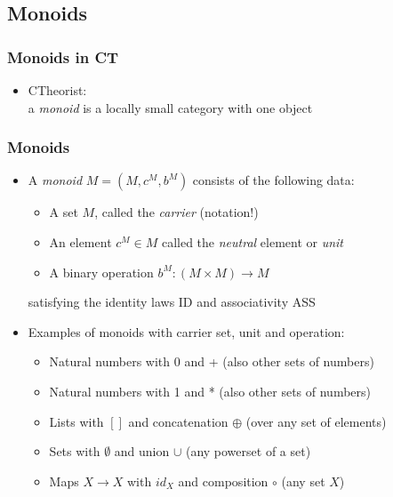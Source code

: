 \documentclass[handout]{beamer}
\begin{document}
\subsection{Monoids}


\frame
  {   
    \frametitle{Monoids in CT}\label{Ch2:CTMonoid}

 \begin{itemize}[<+->]
\item CTheorist: \\a \emph{monoid} is a locally small category with one object
 \end{itemize}

 }

\frame
  {   
    \frametitle{Monoids}\label{Ch2:Monoid}

 \begin{itemize}[<+->]
\item A \emph{monoid} $M=(M,c^M,b^M)$ consists of the following data:
   \begin{itemize}[<+->]
\item A set $M$, called the \emph{carrier} (notation!)
\item An element $c^M \in M$ called the \emph{neutral} element or \emph{unit}
\item A binary operation $b^M : (M\times M) \to M$
   \end{itemize}
satisfying the identity laws ID and associativity ASS
\item Examples of monoids with carrier set, unit and operation:   
\begin{itemize}[<+->]
\item Natural numbers with 0 and + (also other sets of numbers)
\item Natural numbers with 1 and * (also other sets of numbers)
\item Lists with $[]$ and concatenation $\oplus$ (over any set of elements)
\item Sets with $\emptyset$ and union $\cup$ (any powerset of a set)
\item Maps $X\to X$ with $id_X$ and composition $\circ$ (any set $X$)
   \end{itemize}
 \end{itemize}

 }
\end{document}
